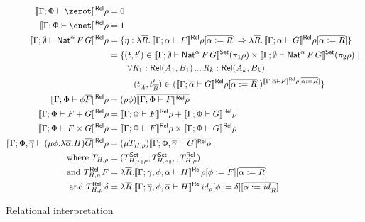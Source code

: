\documentclass[runningheads]{llncs}
\newcommand{\set}{\mathsf{Set}}
\renewcommand{\id}{\mathit{id}}
\renewcommand{\id}{\mathit{id}}
\begin{document}
\begin{figure}[t]
\begin{adjustbox}{varwidth=5in, max width=5in, fbox, center}
  \begin{align*}
  \relsem{\Gamma;\Phi \vdash \zerot}\rho &= 0\\
  \relsem{\Gamma;\Phi \vdash \onet}\rho &= 1\\
  \relsem{\Gamma; \emptyset \vdash \Nat^{\ol{\alpha}} \,F\,G}\rho &= \{\eta
  : \lambda \ol{R}.\,\relsem{\Gamma; \ol{\alpha} \vdash
    F}\rho[\ol{\alpha := R}] \Rightarrow \lambda \ol{R}. \,\relsem{
    \Gamma; \ol{\alpha} \vdash G}\rho[\ol{\alpha := R}]\}\\
  &=
  \{(t,t') \in \setsem{\Gamma; \emptyset
    \vdash \Nat^{\ol{\alpha}}
    \,F\,G} (\pi_1 \rho) \times \setsem{ 
    \Gamma;\emptyset
    \vdash \Nat^{\ol{\alpha}} \,F\,G} (\pi_2
  \rho)~|~\\ 
  & \hspace{0.3in} \forall {R_1 : \rel(A_1,B_1)}\,...\,{R_k : \rel(A_k,B_k)}.\\
  & \hspace{0.4in} (t_{\ol{A}},t'_{\ol{B}}) \in
  (\relsem{\Gamma; \ol{\alpha} \vdash G}\rho[\ol{\alpha :=
      R}])^{\relsem{\Gamma;\ol{\alpha}\vdash F}\rho[\ol{\alpha := R}]} \}\\  
  \relsem{\Gamma;\Phi \vdash \phi \ol{F}}\rho &=
  (\rho\phi)\ol{\relsem{\Gamma;\Phi \vdash 
    F}\rho}\\
  \relsem{\Gamma;\Phi \vdash F+G}\rho &=
  \relsem{\Gamma;\Phi \vdash F}\rho +
  \relsem{\Gamma;\Phi \vdash G}\rho\\
  \relsem{\Gamma;\Phi \vdash F\times G}\rho &=
  \relsem{\Gamma;\Phi \vdash F}\rho \times
  \relsem{\Gamma;\Phi \vdash G}\rho\\  
   \relsem{\Gamma;\Phi,\ol\gamma \vdash (\mu \phi.\lambda
    \ol{\alpha}. H)\ol{G}}\rho
  &= (\mu T_{H,\rho})\ol{\relsem{\Gamma;\Phi,\ol\gamma \vdash
     G}\rho}\\
  \text{where }	T_{H,\rho}
    &= (T^\set_{H,\pi_1\rho}, T^\set_{H,\pi_2\rho}, T^\rel_{H,\rho}) \\
  \text{and } T^\rel_{H,\rho}\,F
    &= \lambda \ol{R}. \relsem{
      \Gamma;\ol\gamma,\phi,\ol{\alpha} \vdash H}\rho[\phi :=
    F][\ol{\alpha := R}]\\
  \text{and } T^\rel_{H,\rho}\,\delta
    &= \lambda \ol{R}. \relsem{
      \Gamma;\ol\gamma,\phi,\ol{\alpha} \vdash H}\id_\rho[\phi :=
    \delta][\ol{\alpha := \id_{\ol{R}}}]
\end{align*}
\vspace*{-0.3in}\caption{Relational
  interpretation}\label{fig:rel-sem} \vspace*{-0.15in} 
\end{adjustbox}
\end{figure}
\end{document}
